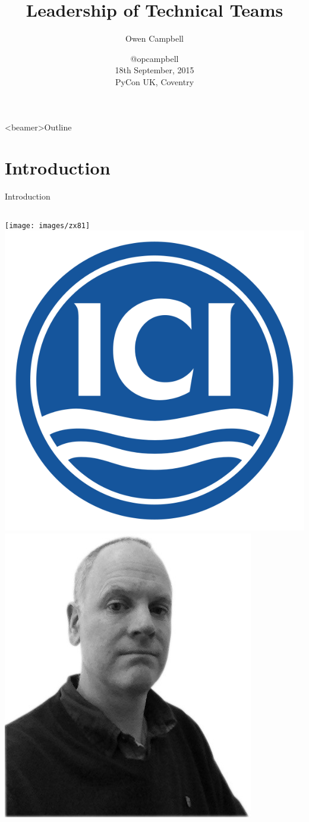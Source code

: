 \documentclass[14pt]{beamer}
\title{Leadership of Technical Teams}
\author{Owen Campbell}
\date[PyCon UK 2015]{
  @opcampbell\\
  \vspace{1cm}
  18th September, 2015\\
  PyCon UK, Coventry}
\begin{document}
\begin{frame}
  \titlepage{}
\end{frame}

{
  \begin{frame}<beamer>{Outline}
    \tableofcontents
  \end{frame}
}

  \section{Introduction}

    \begin{frame}{Introduction}
    \pause
      \begin{columns}
          \texttt{[image: images/zx81]}
        \pause
          \includegraphics[scale=0.1]{images/ici}\\[2em]
          \includegraphics[scale=0.17]{images/owencampbell}

\end{columns}
\end{frame}
\end{document}
